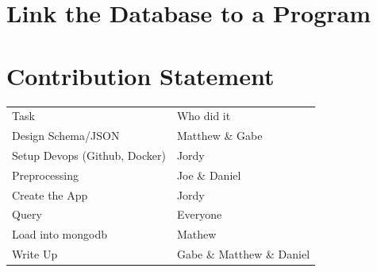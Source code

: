 \documentclass[11pt]{article}
\begin{document}
\section{Link the Database to a Program}
\label{sec:org87346a5}

\section{Contribution Statement}
\label{sec:org1f1d9c2}

\begin{center}
\begin{tabular}{ll}
\hline
Task & Who did it\\
Design Schema/JSON & Matthew \& Gabe\\
Setup Devops (Github, Docker) & Jordy\\
Preprocessing & Joe \& Daniel\\
Create the App & Jordy\\
Query & Everyone\\
Load into mongodb & Mathew\\
Write Up & Gabe \& Matthew \& Daniel\\
\hline
\end{tabular}
\end{center}
\end{document}
